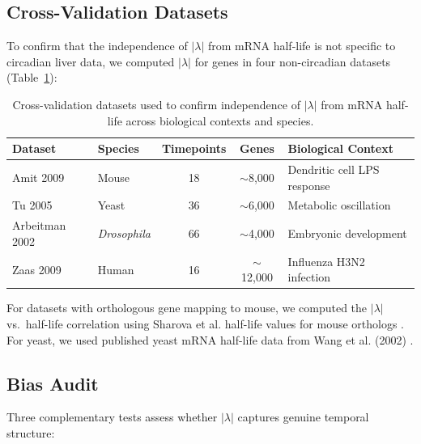 \documentclass[11pt,letterpaper]{article}
\begin{document}
\subsection{Cross-Validation Datasets}
\label{sec:crossval}

To confirm that the independence of $|\lambda|$ from mRNA half-life is not specific to circadian liver data, we computed $|\lambda|$ for genes in four non-circadian datasets (Table~\ref{tab:crossval}):

\begin{table}[H]
\centering
\caption{Cross-validation datasets used to confirm independence of $|\lambda|$ from mRNA half-life across biological contexts and species.}
\label{tab:crossval}
\begin{tabular}{llccl}
\toprule
\textbf{Dataset} & \textbf{Species} & \textbf{Timepoints} & \textbf{Genes} & \textbf{Biological Context} \\
\midrule
Amit 2009 & Mouse & 18 & $\sim$8{,}000 & Dendritic cell LPS response \\
Tu 2005 & Yeast & 36 & $\sim$6{,}000 & Metabolic oscillation \\
Arbeitman 2002 & \textit{Drosophila} & 66 & $\sim$4{,}000 & Embryonic development \\
Zaas 2009 & Human & 16 & $\sim$12{,}000 & Influenza H3N2 infection \\
\bottomrule
\end{tabular}
\end{table}

For datasets with orthologous gene mapping to mouse, we computed the $|\lambda|$ vs.\ half-life correlation using Sharova et al. half-life values for mouse orthologs \citep{ensembl2023}. For yeast, we used published yeast mRNA half-life data from Wang et al. (2002) \citep{wang2002precision}.

\subsection{Bias Audit}
\label{sec:bias}

Three complementary tests assess whether $|\lambda|$ captures genuine temporal structure:
\end{document}
